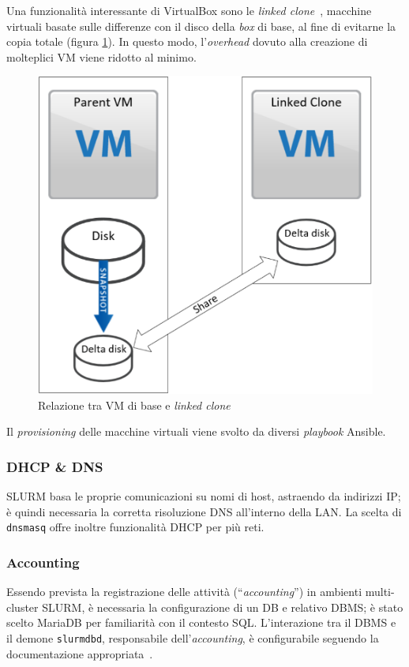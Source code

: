\documentclass[12pt,a4paper,twoside,openright]{book}
\begin{document}
Una funzionalità interessante di VirtualBox sono le \textit{linked clone}~\cite{linkedclone}, macchine virtuali basate sulle differenze con il disco della \textit{box} di base, al fine di evitarne la copia totale (figura \ref{fig:linked-clone}). In questo modo, l'\textit{overhead} dovuto alla creazione di molteplici \ac{VM} viene ridotto al minimo.
\begin{figure}[ht]
    \centering
    \includegraphics[width=0.5\linewidth]{images/linked_clone.png}
    \caption{Relazione tra \ac{VM} di base e \textit{linked clone}~\cite{clonetypes}}
    \label{fig:linked-clone}
\end{figure}

Il \textit{provisioning} delle macchine virtuali viene svolto da diversi \textit{playbook} Ansible.

\subsubsection{DHCP \& DNS}
\ac{SLURM} basa le proprie comunicazioni su nomi di host, astraendo da indirizzi \ac{IP}; è quindi necessaria la corretta risoluzione \ac{DNS} all'interno della \ac{LAN}. La scelta di \texttt{dnsmasq} offre inoltre funzionalità \ac{DHCP} per più reti.

\subsubsection{Accounting}
Essendo prevista la registrazione delle attività (``\textit{accounting}'') in ambienti multi-cluster \ac{SLURM}, è necessaria la configurazione di un \ac{DB} e relativo \ac{DBMS}; è stato scelto Maria\acs{DB} per familiarità con il contesto \ac{SQL}. L'interazione tra il \ac{DBMS} e il demone \texttt{slurmdbd}, responsabile dell'\textit{accounting}, è configurabile seguendo la documentazione appropriata~\cite{slurmaccounting}.
\end{document}
